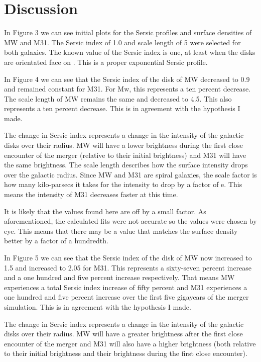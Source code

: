 \documentclass[linenumbers,trackchanges,twocolumn]{aastex7}
\begin{document}
\section{Discussion} \label{sec:style}

In Figure 3 we can see initial plots for the Sersic profiles and surface densities of MW and M31. The Sersic index of 1.0 and scale length of 5
were selected for both galaxies.
The known value of the Sersic index is one, at least when the
disks are orientated face on \citep{Pastrav_Popescu_Tuffs_Sansom_2013}.
This is a proper exponential Sersic profile.

In Figure 4 we can see that the Sersic index of the disk of MW
decreased to 0.9 and remained constant for M31. For Mw, this represents a
ten percent decrease. The scale length of MW remains the same and decreased to 4.5. This also represents a ten percent decrease. This is in agreement with the hypothesis I made.

The change in Sersic index represents a change in the intensity of the
galactic disks over their radius. MW will have a lower brightness
during the first close encounter of the merger (relative to their initial brightness) and M31 will have the same brightness. The scale length
describes how the surface intensity drops over the galactic radius. Since
MW and M31 are spiral galaxies, the scale factor is how many kilo-parsecs
it takes for the intensity to drop by a factor of e. This means the
intensity of M31 decreases faster at this time.

It is likely that the values found here are off by a small factor. As
aforementioned, the calculated fits were not accurate so the values were
chosen by eye. This means that there may be a value that matches the surface density better by a factor of a hundredth.

In Figure 5 we can see that the Sersic index of the disk of MW
now increased to 1.5 and increased to 2.05 for M31. This
represents a sixty-seven percent increase and a one hundred and five percent increase respectively. That means MW experiences a total
Sersic index increase of fifty percent and M31
experiences a one hundred and five percent increase over the first five gigayears of
the merger simulation. This is in agreement with the hypothesis I made.

The change in Sersic index represents a change in the intensity of the
galactic disks over their radius. MW will have a greater brightness
after the first close encounter of the merger and M31 will also have a
higher brightness (both relative to their initial brightness and their
brightness during the first close encounter).
\end{document}
